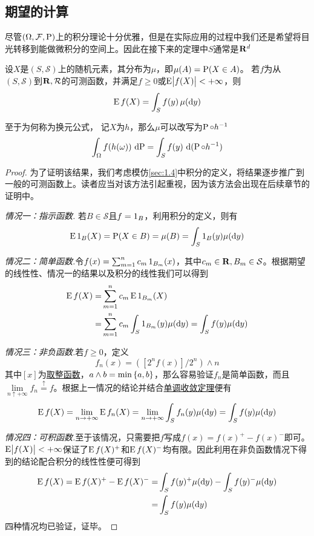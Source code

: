 \documentclass[../main.tex]{subfiles}
\begin{document}
\subsection{期望的计算}
尽管\((\Omega, \mathcal{F}, \operatorname{\mathrm{P}})\)上的积分理论十分优雅，但是在实际应用的过程中我们还是希望将目光转移到能做微积分的空间上。因此在接下来的定理中\(S\)通常是\(\mathbf{R}^d\)

\begin{theorem}[换元公式]
\label{thm:1.6.9}
设\(X\)是\((S,\mathcal{S})\)上的随机元素，其分布为\(\mu\)，即\(\mu(A) = \operatorname{\mathrm{P}}(X\in A)\)。
若\(f\)为从\((S,\mathcal{S})\)到\(\mathbf{R}, \mathcal{R}\)的可测函数，并满足\(f\geq0\)或\(\E\envert{f(X)}<+\infty\)，则
\[\E f(X)=\int_Sf(y)\,\mu(\dif y)\]
\end{theorem}
\begin{remark}
至于为何称为换元公式，
记\(X\)为\(h\)，那么\(\mu\)可以改写为\(\operatorname{\mathrm{P}}\circ h^{-1}\)
\[\int_{\Omega}f(h(\omega))\,\dif\probP=\int_Sf(y)\,\dif \,(\probP\circ h^{-1})\]
\end{remark}
\begin{proof}
为了证明该结果，我们考虑模仿\ref{sec:1.4}中积分的定义，将结果逐步推广到一般的可测函数上。读者应当对该方法引起重视，因为该方法会出现在后续章节的证明中。

\noindent\textit{情况一：指示函数.} 若\(B\in\mathcal{S}\)且\(f=\operatorname{1}_B\)，利用积分的定义，则有
\[\E\indicator_B(X)=\probP(X\in B)=\mu(B)=\int_S\indicator_B(y)\mu(\dif y)\]

\noindent\textit{情况二：简单函数.}令\(f(x)=\sum_{m=1}^nc_m\operatorname{1}_{B_m}(x)\)，其中\(c_m\in\mathbf{R}, B_m\in\mathcal{S}\)。根据期望的线性性、情况一的结果以及积分的线性我们可以得到
\[\begin{split}
	\E f(X)=&\sum_{m=1}^nc_m\E \indicator_{B_m}(X)\\
	=&\sum_{m=1}^nc_m\int_S \indicator_{B_m}(y)\mu(\dif y)=\int_Sf(y)\mu(\dif y)
\end{split}\]

\noindent\textit{情况三：非负函数.}若\(f\geq0\)，定义
\[f_n(x)=([2^nf(x)]/2^n)\wedge n\]
其中\([x]\)为\hyperlink{https://zh.wikipedia.org/zh-hans/取整函数}{取整函数}，\(a\wedge b=\min\cbr{a,b}\)，那么容易验证\(f_n\)是简单函数，而且\(\lim\limits_{n\uparrow+\infty}f_n \stackrel{\uparrow}{=} f\)。根据上一情况的结论并结合\hyperref[thm:1.5.5]{单调收敛定理}便有
\[\E f(X)=\lim_{n\rightarrow+\infty}\E f_n(X)=\lim_{n\rightarrow+\infty}\int_Sf_n(y)\mu(\dif y)
=\int_Sf(y)\mu(\dif y)\]

\noindent\textit{情况四：可积函数.}至于该情况，只需要把\(f\)写成\(f(x)=f(x)^+-f(x)^-\)即可。\(\E\envert{f(X)}<+\infty\)保证了\(\operatorname{E} f(X)^+\)和\(\operatorname{E} f(X)^-\)均有限。因此利用在非负函数情况下得到的结论配合积分的线性性便可得到
\[\begin{split}
	\E f(X)=\E f(X)^+ - \E f(X)^-=&\int_S f(y)^+\mu(\dif y)-\int_S f(y)^-\mu(\dif y)\\
	=&\int_S f(y)\mu(\dif y)
\end{split}\]
四种情况均已验证，证毕。
\end{proof}
\end{document}
